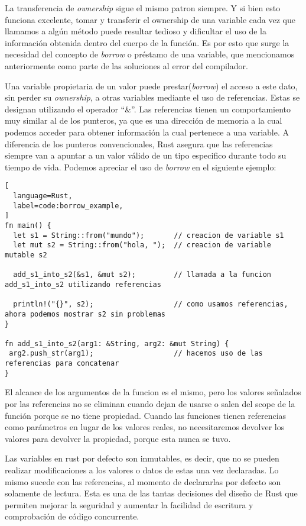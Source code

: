 La transferencia de \textit{ownership} sigue el mismo patron siempre. Y si bien esto funciona excelente, tomar y transferir el ownership de una variable cada vez que llamamos a algún método puede resultar tedioso y dificultar el uso de la información obtenida dentro del cuerpo de la función. Es por esto que surge la necesidad del concepto de \textit{borrow} o préstamo de una variable, que mencionamos anteriormente como parte de las soluciones al error del compilador.

Una variable propietaria de un valor puede prestar(\textit{borrow}) el acceso a este dato, sin perder su \textit{ownership}, a otras variables mediante el uso de referencias. Estas se designan utilizando el operador ``\&''. Las referencias tienen un comportamiento muy similar al de los punteros, ya que es una dirección de memoria a la cual podemos acceder para obtener información la cual pertenece a una variable. A diferencia de los punteros convencionales, Rust asegura que las referencias siempre van a apuntar a un valor válido de un tipo especifico durante todo su tiempo de vida. Podemos apreciar el uso de \textit{borrow} en el siguiente ejemplo:

\begin{lstlisting}[
  language=Rust,
  label=code:borrow_example,
]
fn main() {
  let s1 = String::from("mundo");       // creacion de variable s1
  let mut s2 = String::from("hola, ");  // creacion de variable mutable s2

  add_s1_into_s2(&s1, &mut s2);         // llamada a la funcion add_s1_into_s2 utilizando referencias

  println!("{}", s2);                   // como usamos referencias, ahora podemos mostrar s2 sin problemas
}

fn add_s1_into_s2(arg1: &String, arg2: &mut String) {
 arg2.push_str(arg1);                   // hacemos uso de las referencias para concatenar
}
\end{lstlisting}

El alcance de los argumentos de la funcion es el mismo, pero los valores señalados por las referencias no se eliminan cuando dejan de usarse o salen del scope de la función porque se no tiene propiedad. Cuando las funciones tienen referencias como parámetros en lugar de los valores reales, no necesitaremos devolver los valores para devolver la propiedad, porque esta nunca se tuvo.

Las variables en rust por defecto son inmutables, es decir, que no se pueden realizar modificaciones a los valores o datos de estas una vez declaradas. Lo mismo sucede con las referencias, al momento de declararlas por defecto son solamente de lectura. Esta es una de las tantas decisiones del diseño de Rust que permiten mejorar la seguridad y aumentar la facilidad de escritura y comprobación de código concurrente.

